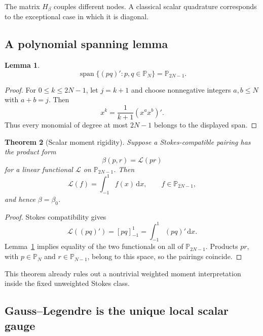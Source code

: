 \documentclass[11pt,a4paper]{article}
\newtheorem{theorem}{Theorem}[section]
\newtheorem{lemma}[theorem]{Lemma}
\theoremstyle{definition}
\theoremstyle{remark}
\newcommand{\Pp}{\mathbb{P}}
\newcommand{\spanof}{\operatorname{span}}
\newcommand{\dd}{\,\mathrm{d}}
\newcommand{\bracket}[1]{\left[#1\right]_{-1}^{1}}
\begin{document}
The matrix $H_\beta$ couples different nodes.  A classical scalar quadrature corresponds to
the exceptional case in which it is diagonal.

\subsection{A polynomial spanning lemma}

\begin{lemma}\label{lem:derivativeproducts}
\begin{equation}\label{eq:spanproducts}
 \spanof\{(pq)':p,q\in\Pp_N\}=\Pp_{2N-1}.
\end{equation}
\end{lemma}

\begin{proof}
For $0\leq k\leq2N-1$, let $j=k+1$ and choose nonnegative integers $a,b\leq N$ with
$a+b=j$.  Then
\[
 x^k=\frac1{k+1}(x^ax^b)'.
\]
Thus every monomial of degree at most $2N-1$ belongs to the displayed span.
\end{proof}

\begin{theorem}[Scalar moment rigidity]\label{thm:momentrigidity}
Suppose a Stokes-compatible pairing has the product form
\begin{equation}\label{eq:momentform}
 \beta(p,r)=\mathcal L(pr)
\end{equation}
for a linear functional $\mathcal L$ on $\Pp_{2N-1}$.  Then
\begin{equation}\label{eq:Llebesgue}
 \mathcal L(f)=\int_{-1}^{1}f(x)\dd x,
 \qquad f\in\Pp_{2N-1},
\end{equation}
and hence $\beta=\beta_0$.
\end{theorem}

\begin{proof}
Stokes compatibility gives
\[
 \mathcal L((pq)')=\bracket{pq}=\int_{-1}^{1}(pq)'\dd x.
\]
Lemma~\ref{lem:derivativeproducts} implies equality of the two functionals on all of
$\Pp_{2N-1}$.  Products $pr$, with $p\in\Pp_N$ and $r\in\Pp_{N-1}$, belong to this space,
so the pairings coincide.
\end{proof}

This theorem already rules out a nontrivial weighted moment interpretation inside the fixed
unweighted Stokes class.

\subsection{Gauss--Legendre is the unique local scalar gauge}
\end{document}
